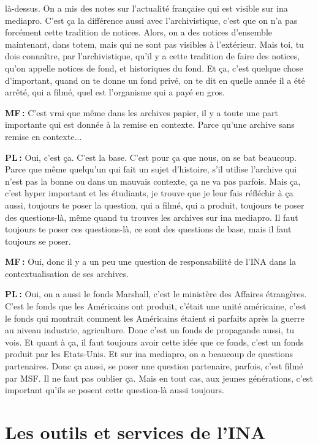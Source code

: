 là-dessus.  On a mis des notes sur l’actualité française qui est visible sur ina mediapro. C'est ça la différence aussi avec l’archivistique, c'est que on n'a pas forcément cette tradition de notices.  Alors, on a des notices d’ensemble maintenant, dans totem, mais qui ne sont pas visibles à l'extérieur. Mais toi, tu dois connaître, par l’archivistique, qu'il y a cette tradition de faire des notices, qu’on appelle notices de fond, et historiques du fond. Et ça, c'est quelque chose d'important, quand on te donne un fond privé, on te dit en quelle année il a été arrêté, qui a filmé, quel est l'organisme qui a payé en gros. 

\textbf{MF :} C'est vrai que même dans les archives papier, il y a toute une part importante qui est donnée à la remise en contexte. Parce qu'une archive sans remise en contexte... 

\textbf{PL :} Oui, c'est ça. C'est la base.  C'est pour ça que nous, on se bat beaucoup. Parce que même quelqu'un qui fait un sujet d'histoire, s'il utilise l'archive qui n'est pas la bonne ou dans un mauvais contexte, ça ne va pas parfois. Mais ça, c'est hyper important et les étudiants, je trouve que je leur fais réfléchir à ça aussi, toujours te poser la question, qui a filmé, qui a produit, toujours te poser des questions-là, même quand tu trouves les archives sur ina mediapro. Il faut toujours te poser ces questions-là, ce sont des questions de base, mais il faut toujours se poser.  

\textbf{MF :} Oui, donc il y a un peu une question de responsabilité de l'INA dans la contextualisation de ses archives. 

\textbf{PL :} Oui, on a aussi le fonds Marshall, c'est le ministère des Affaires étrangères. C'est le fonds que les Américains ont produit, c'était une unité américaine, c'est le fonds qui montrait comment les Américains étaient si parfaits après la guerre au niveau industrie, agriculture.  Donc c'est un fonds de propagande aussi, tu vois.  Et quant à ça, il faut toujours avoir cette idée que ce fonds, c'est un fonds produit par les Etats-Unis. Et sur ina mediapro, on a beaucoup de questions partenaires. Donc ça aussi, se poser une question partenaire, parfois, c'est filmé par MSF. Il ne faut pas oublier ça.  Mais en tout cas, aux jeunes générations, c'est important qu'ils se posent cette question-là aussi toujours. 

\section*{Les outils et services de l’INA }

